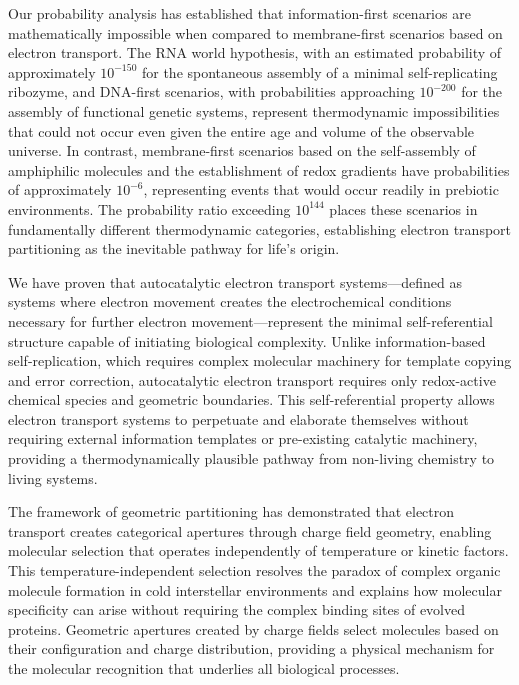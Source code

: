 \documentclass[12pt,a4paper]{article}
\begin{document}
Our probability analysis has established that information-first scenarios are mathematically impossible when compared to membrane-first scenarios based on electron transport. The RNA world hypothesis, with an estimated probability of approximately $10^{-150}$ for the spontaneous assembly of a minimal self-replicating ribozyme, and DNA-first scenarios, with probabilities approaching $10^{-200}$ for the assembly of functional genetic systems, represent thermodynamic impossibilities that could not occur even given the entire age and volume of the observable universe. In contrast, membrane-first scenarios based on the self-assembly of amphiphilic molecules and the establishment of redox gradients have probabilities of approximately $10^{-6}$, representing events that would occur readily in prebiotic environments. The probability ratio exceeding $10^{144}$ places these scenarios in fundamentally different thermodynamic categories, establishing electron transport partitioning as the inevitable pathway for life's origin.

We have proven that autocatalytic electron transport systems—defined as systems where electron movement creates the electrochemical conditions necessary for further electron movement—represent the minimal self-referential structure capable of initiating biological complexity. Unlike information-based self-replication, which requires complex molecular machinery for template copying and error correction, autocatalytic electron transport requires only redox-active chemical species and geometric boundaries. This self-referential property allows electron transport systems to perpetuate and elaborate themselves without requiring external information templates or pre-existing catalytic machinery, providing a thermodynamically plausible pathway from non-living chemistry to living systems.

The framework of geometric partitioning has demonstrated that electron transport creates categorical apertures through charge field geometry, enabling molecular selection that operates independently of temperature or kinetic factors. This temperature-independent selection resolves the paradox of complex organic molecule formation in cold interstellar environments and explains how molecular specificity can arise without requiring the complex binding sites of evolved proteins. Geometric apertures created by charge fields select molecules based on their configuration and charge distribution, providing a physical mechanism for the molecular recognition that underlies all biological processes.
\end{document}
